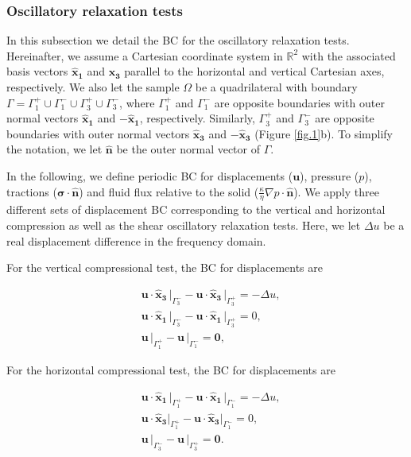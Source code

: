 \documentclass[draft]{agujournal2019}
\begin{document}
 
\subsubsection{Oscillatory relaxation tests}
In this subsection we detail the BC for the oscillatory relaxation tests. 
Hereinafter, we assume a Cartesian coordinate system in $\mathbb R^2$ with the associated basis vectors $\bm{\hat x_1}$ and $\bm{\hat x_3}$ parallel to the horizontal and vertical Cartesian axes, respectively. We also
let the sample $\Omega$ be a quadrilateral with boundary $\Gamma = \Gamma_1^+ \cup \Gamma_1^- \cup \Gamma_3^+ \cup \Gamma_3^- $, where $\Gamma_1^+ $ and $\Gamma_1^- $ are opposite boundaries with outer normal vectors $\bm{\hat x_1}$ and $ -\bm{\hat x_1}$, respectively. Similarly, $\Gamma_3^+ $ and $\Gamma_3^- $ are opposite boundaries with outer normal vectors $\bm{\hat x_3}$ and $ -\bm{\hat x_3}$ (Figure \ref{fig.1}b). To simplify the notation, we let $ \bm{\hat n}$ be the outer normal vector
of $\Gamma$.

In the following, we define periodic BC for displacements ($\bm{u}$), pressure ($p$), tractions ($\bm{\sigma}\cdot \bm{\hat n} $) and fluid flux relative to the solid ($\frac{\kappa}{\eta} \nabla p \cdot \bm{\hat n}$). We apply three different sets of displacement BC corresponding to the vertical and horizontal compression as well as the shear oscillatory relaxation tests. Here, we let $\Delta u$ be a real displacement difference in the frequency domain.

For the vertical compressional test, the BC for displacements are
\begin{linenomath*}
\begin{equation}\label{Eq.8}
\begin{split}
&  \bm{u} \cdot \bm{\hat{x}_3} \, \vert_{\Gamma_3^-} - \bm{u}\cdot \bm{\hat{x}_3}\, \vert_{\Gamma_3^+} =- \Delta u, \\
&  \bm{u} \cdot \bm{\hat{x}_1}\, \vert_{\Gamma_3^-} - \bm{u} \cdot \bm{\hat{x}_1} \, \vert_{\Gamma_3^+} = 0, \\
& \bm{u}\,\vert_{\Gamma_1^+} - \bm{u}\,\vert_{\Gamma_1^-} = \bm{0},
\end{split}
\end{equation}
\end{linenomath*}

For the horizontal compressional test, the BC for displacements are
\begin{linenomath*}
\begin{equation}\label{Eq.9}
\begin{split}
& \bm{u} \cdot \bm{\hat{x}_1}\, \vert_{\Gamma_1^+}-\bm{u} \cdot \bm{\hat{x}_1}\, \vert_{\Gamma_1^-} = - \Delta u, \\
& \bm{u} \cdot \bm{\hat{x}_3} \vert_{\Gamma_1^+}- \bm{u} \cdot \bm{\hat{x}_3}\vert_{\Gamma_1^-} =  0,  \\
& \bm{u}\,\vert_{\Gamma_3^-}- \bm{u}\,\vert_{\Gamma_3^+} = \bm{0}.
\end{split}
\end{equation}
\end{linenomath*}
\end{document}

